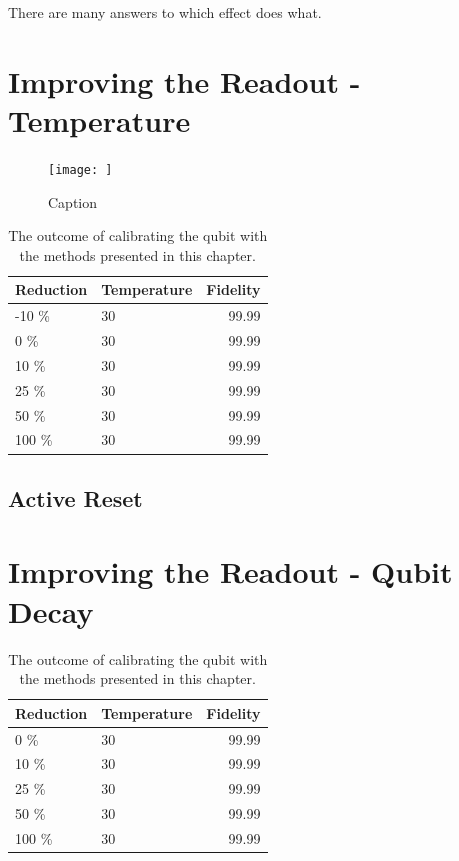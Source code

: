 There are many answers to which effect does what.

\section{Improving the Readout - Temperature}

\begin{figure}
    \centering
    \texttt{[image: ]}
    \caption{Caption}
    \label{fig:enter-label}
\end{figure}

\begin{table}[h]
\centering
\caption{The outcome of calibrating the qubit with the methods presented in this chapter.}
\begin{tabular}{ll|r}
\hline
\textbf{Reduction}        & Temperature                  & Fidelity\\ \hline
-10 \%                     &  30                         &  99.99\\
0   \%                     &  30                         &  99.99\\
10  \%                     &  30                         &  99.99\\
25  \%                     &  30                         &  99.99\\
50  \%                     &  30                         &  99.99\\
100 \%                     &  30                         &  99.99\\
\end{tabular}
\label{tab:readout_infidelity_contribution_estimation}
\end{table}


\subsection{Active Reset}

\section{Improving the Readout - Qubit Decay}


\begin{table}[h]
\centering
\caption{The outcome of calibrating the qubit with the methods presented in this chapter.}
\begin{tabular}{ll|r}
\hline
\textbf{Reduction}        & Temperature                  & Fidelity\\ \hline
0   \%                      &  30                        &  99.99\\
10  \%                     &  30                         &  99.99\\
25  \%                     &  30                         &  99.99\\
50  \%                     &  30                         &  99.99\\
100 \%                     &  30                         &  99.99\\
\end{tabular}
\label{tab:readout_infidelity_contribution_estimation}
\end{table}



